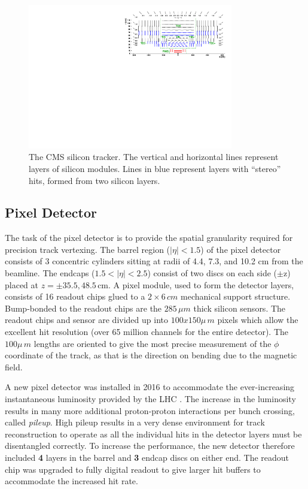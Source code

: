 \begin{figure}
\centering
\includegraphics[width=0.8\textwidth]{figs/TrackerLayoutNew.pdf}
\caption[The CMS silicon tracker]{The CMS silicon tracker. The vertical and horizontal lines represent layers of silicon modules. Lines in blue represent layers with ``stereo'' hits, formed from two silicon layers.}
\label{fig:tracker}
\end{figure}

\subsection{Pixel Detector}

The task of the pixel detector is to provide the spatial granularity required for precision track vertexing. The barrel region ($|\eta|<1.5$) of the pixel detector consists of 3 concentric cylinders sitting at radii of 4.4, 7.3, and 10.2 cm from the beamline. The endcaps ($1.5<|\eta|<2.5$) consist of two discs on each side ($\pm$z) placed at $z = \pm 35.5, 48.5\,\textrm{cm}$. A pixel module, used to form the detector layers, consists of 16 readout chips glued to a $2\times6\,cm$ mechanical support structure. Bump-bonded to the readout chips are the $285\,\mu m$ thick silicon sensors. The readout chips and sensor are divided up into $100x150\mu\,m$ pixels which allow the excellent hit resolution (over 65 million channels for the entire detector). The $100\mu\,m$ lengths are oriented to give the most precise measurement of the $\phi$ coordinate of the track, as that is the direction on bending due to the magnetic field.  

A new pixel detector was installed in 2016 to accommodate the ever-increasing instantaneous luminosity provided by the LHC \cite{newpixel}. The increase in the luminosity results in many more additional proton-proton interactions per bunch crossing, called \textit{pileup}.  High pileup results in a very dense environment for track reconstruction to operate as all the individual hits in the detector layers must be disentangled correctly. To increase the performance, the new detector therefore included \textbf{4} layers in the barrel and \textbf{3} endcap discs on either end. The readout chip was upgraded to fully digital readout to give larger hit buffers to accommodate the increased hit rate.

